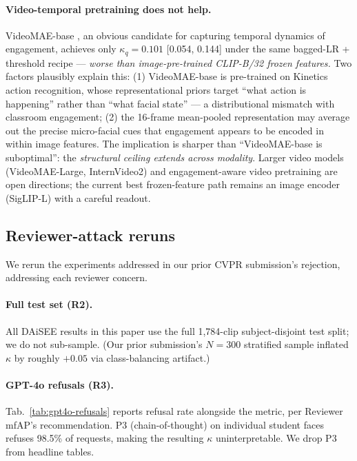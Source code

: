 \paragraph{Video-temporal pretraining does not help.} VideoMAE-base
\cite{tong2022videomae}, an obvious candidate for capturing temporal
dynamics of engagement, achieves only $\kappa_q = 0.101$ [0.054,
0.144] under the same bagged-LR + threshold recipe ---
\emph{worse than image-pre-trained CLIP-B/32 frozen features.} Two
factors plausibly explain this: (1) VideoMAE-base is pre-trained on
Kinetics action recognition, whose representational priors target
``what action is happening'' rather than ``what facial state'' --- a
distributional mismatch with classroom engagement; (2) the 16-frame
mean-pooled representation may average out the precise micro-facial
cues that engagement appears to be encoded in within image features.
The implication is sharper than ``VideoMAE-base is suboptimal'': the
\emph{structural ceiling extends across modality}. Larger video models
(VideoMAE-Large, InternVideo2) and engagement-aware video pretraining
are open directions; the current best frozen-feature path remains an
image encoder (SigLIP-L) with a careful readout.

\subsection{Reviewer-attack reruns}
\label{sec:attacks}

We rerun the experiments addressed in our prior CVPR submission's
rejection, addressing each reviewer concern.

\paragraph{Full test set (R2).} All DAiSEE results in this paper
use the full 1,784-clip subject-disjoint test split; we do not
sub-sample. (Our prior submission's $N = 300$ stratified sample
inflated $\kappa$ by roughly $+0.05$ via class-balancing artifact.)

\paragraph{GPT-4o refusals (R3).} Tab.~\ref{tab:gpt4o-refusals}
reports refusal rate alongside the metric, per Reviewer mfAP's
recommendation. P3 (chain-of-thought) on individual student faces
refuses 98.5\% of requests, making the resulting $\kappa$
uninterpretable. We drop P3 from headline tables.

